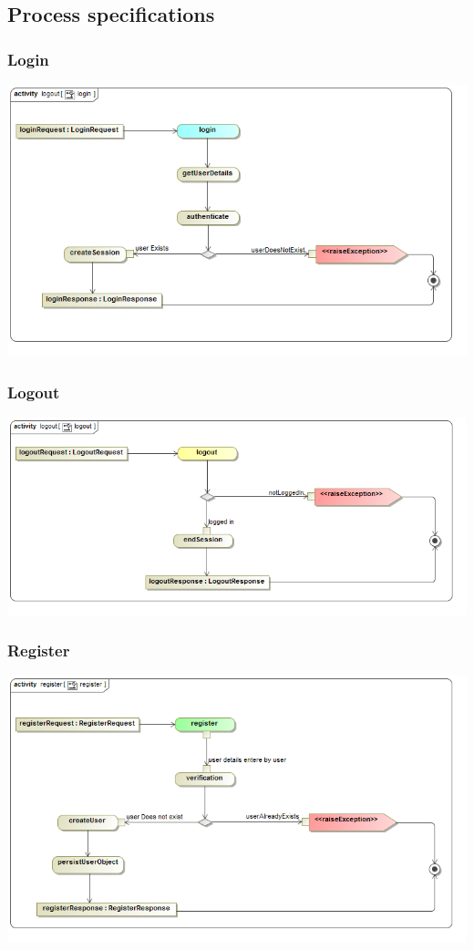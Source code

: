 \documentclass[a4paper,12pt]{article}
\begin{document}

\subsection{Process specifications}
\subsubsection{Login}
\includegraphics[width=1\textwidth]{./Images/newDiagrams/processSpecification/Diana/login.png}
\subsubsection{Logout}
\includegraphics[width=1\textwidth]{./Images/newDiagrams/processSpecification/Diana/logout.png}
\subsubsection{Register}
\includegraphics[width=1\textwidth]{./Images/newDiagrams/processSpecification/Diana/register.png}
\end{document}
